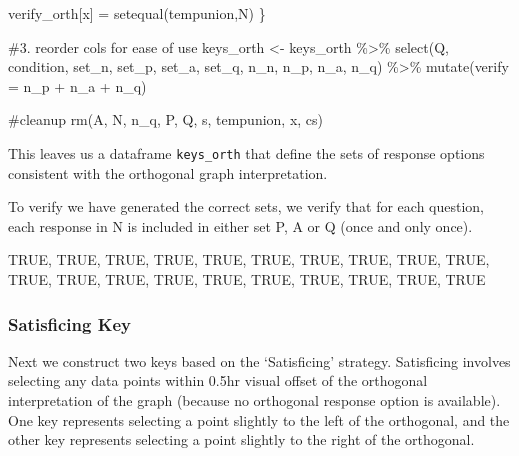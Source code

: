\documentclass[
  letterpaper,
  DIV=11,
  numbers=noendperiod]{scrreprt}
\newenvironment{Shaded}{\begin{snugshade}}{\end{snugshade}}
\newcommand{\AttributeTok}[1]{\textcolor[rgb]{0.40,0.45,0.13}{#1}}
\newcommand{\CommentTok}[1]{\textcolor[rgb]{0.37,0.37,0.37}{#1}}
\newcommand{\FunctionTok}[1]{\textcolor[rgb]{0.28,0.35,0.67}{#1}}
\newcommand{\NormalTok}[1]{\textcolor[rgb]{0.00,0.23,0.31}{#1}}
\newcommand{\OtherTok}[1]{\textcolor[rgb]{0.00,0.23,0.31}{#1}}
\newcommand{\SpecialCharTok}[1]{\textcolor[rgb]{0.37,0.37,0.37}{#1}}
\begin{document}
\begin{Shaded}
\begin{Highlighting}[]
\NormalTok{  verify\_orth[x] }\OtherTok{=} \FunctionTok{setequal}\NormalTok{(tempunion,N)}
\NormalTok{\}}

\CommentTok{\#3. reorder cols for ease of use}
\NormalTok{keys\_orth }\OtherTok{\textless{}{-}}\NormalTok{ keys\_orth }\SpecialCharTok{\%\textgreater{}\%} \FunctionTok{select}\NormalTok{(Q, condition, set\_n, set\_p, set\_a, set\_q, n\_n, n\_p, n\_a, n\_q) }\SpecialCharTok{\%\textgreater{}\%} \FunctionTok{mutate}\NormalTok{(}\AttributeTok{verify =}\NormalTok{ n\_p }\SpecialCharTok{+}\NormalTok{ n\_a }\SpecialCharTok{+}\NormalTok{ n\_q)}


\CommentTok{\#cleanup}
\FunctionTok{rm}\NormalTok{(A, N, n\_q, P, Q, s, tempunion, x, cs)}
\end{Highlighting}
\end{Shaded}

This leaves us a dataframe \texttt{keys\_orth} that define the sets of
response options consistent with the orthogonal graph interpretation.

To verify we have generated the correct sets, we verify that for each
question, each response in N is included in either set P, A or Q (once
and only once).

TRUE, TRUE, TRUE, TRUE, TRUE, TRUE, TRUE, TRUE, TRUE, TRUE, TRUE, TRUE,
TRUE, TRUE, TRUE, TRUE, TRUE, TRUE, TRUE, TRUE

\hypertarget{satisficing-key}{%
\subsubsection{Satisficing Key}\label{satisficing-key}}

Next we construct two keys based on the `Satisficing' strategy.
Satisficing involves selecting any data points within 0.5hr visual
offset of the orthogonal interpretation of the graph (because no
orthogonal response option is available). One key represents selecting a
point slightly to the left of the orthogonal, and the other key
represents selecting a point slightly to the right of the orthogonal.
\end{document}
